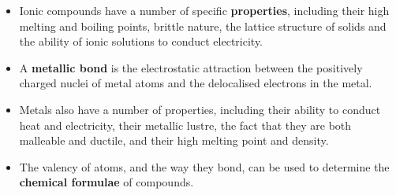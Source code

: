\begin{itemize}[noitemsep]
\label{m38689*uid152}\item Ionic compounds have a number of specific \textbf{properties}, including their high melting and boiling points, brittle nature, the lattice structure of solids and the ability of ionic solutions to conduct electricity.
\label{m38689*uid153}\item A \textbf{metallic bond} is the electrostatic attraction between the positively charged nuclei of metal atoms and the delocalised electrons in the metal.
\label{m38689*uid154}\item Metals also have a number of properties, including their ability to conduct heat and electricity, their metallic lustre, the fact that they are both malleable and ductile, and their high melting point and density.
\label{m38689*uid155}\item The valency of atoms, and the way they bond, can be used to determine the \textbf{chemical formulae} of compounds.
\end{itemize}
\label{m38689*secfhsst!!!underscore!!!id1181}
